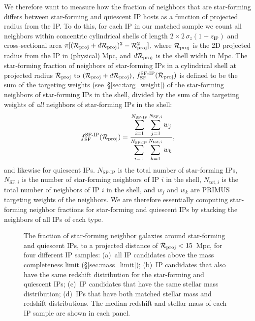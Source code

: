 We therefore want to measure how the fraction of neighbors that are star-forming differs 
between star-forming and quiescent IP hosts as a function of projected radius from 
the IP.
To do this, for each IP in our matched sample we count all neighbors within 
concentric cylindrical shells of length ${2\times2\,\sigma_{z}(1+z_{\text{IP}})}$
and cross-sectional area
${\pi[(\mathcal{R}_{\text{proj}}+d\mathcal{R}_{\text{proj}})^2-\mathcal{R}_{\text{proj}}^2]}$, where $\mathcal{R}_{\text{proj}}$ is the 2D projected radius from the IP in (physical) Mpc, and $d\mathcal{R}_{\text{proj}}$ is the shell width in Mpc.
The star-forming fraction of neighbors of star-forming IPs in a cylindrical shell 
at projected radius $\mathcal{R}_{\text{proj}}$ to ${(\mathcal{R}_{\text{proj}}+d\mathcal{R}_{\text{proj}})}$, $f^{\textrm{SF-IP}}_{\textrm{SF}}
(\mathcal{R}_{\text{proj}})$ is defined to be the sum of the targeting weights (see~\S\ref{sec:targ_weight}) of the star-forming neighbors of star-forming IPs in the shell, 
divided by the sum of the
targeting weights of \emph{all} neighbors of star-forming IPs in the shell:
\begin{equation}
        f^{\textrm{SF-IP}}_{\textrm{SF}}(\Rproj) = \frac
        {\displaystyle \sum_{i=1}^{N_{\textrm{SF-IP}}} \sum_{j=1}^{N_{\textrm{SF},i}} w_{j} }
        {\displaystyle \sum_{i=1}^{N_{\textrm{SF-IP}}} \sum_{k=1}^{N_{\textrm{tot},i}} w_{k} },
\label{eq:SFfrac}
\end{equation}
and likewise for quiescent IPs.
$N_{\textrm{SF-IP}}$ is the total number of star-forming IPs, $N_{\textrm{SF},i}$ is the number of star-forming neighbors of IP $i$ in the shell, $N_{\textrm{tot},i}$ is the
total number of neighbors of IP $i$ in the shell, and $w_{j}$ and $w_{k}$ are PRIMUS targeting weights of the neighbors.
We are therefore essentially computing star-forming neighbor fractions for star-forming 
and quiescent IPs by stacking the neighbors of all IPs of each type.

\begin{figure*}
  \epstrim{0.1in 0.3in 0.4in 0.8in}
  \caption{
The fraction of star-forming neighbor galaxies around star-forming 
and quiescent IPs, to a projected distance of ${\mathcal{R}_{\text{proj}}<15}$~Mpc, 
 for four different IP samples: 
(a)~all IP candidates above the \citet{Moustakas13} mass completeness limit (\S\ref{sec:mass_limit});
(b)~IP candidates that also have the same redshift distribution for the star-forming
and quiescent IPs; 
(c)~IP candidates that have the same stellar mass distribution;
(d)~IPs that have both matched stellar mass and redshift distributions.
The median redshift and stellar mass of each IP sample are shown in each panel.
}
  \label{fig:IPsample_compare}
\end{figure*}


